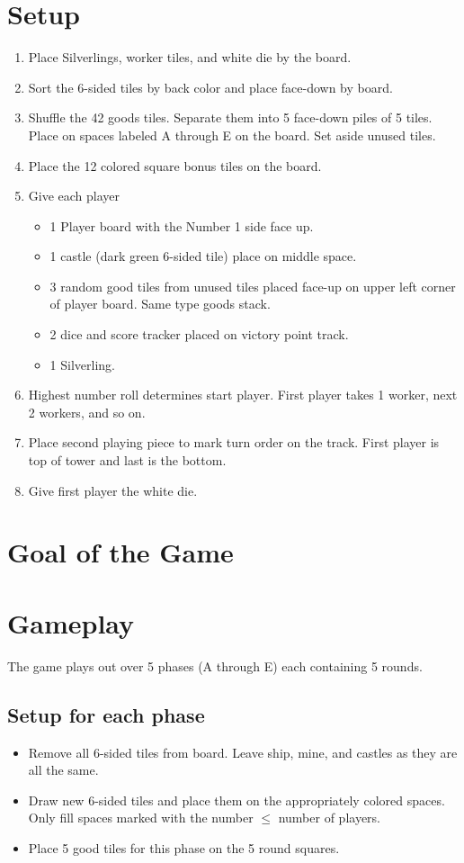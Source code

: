 \documentclass[12pt]{article}
\newenvironment{enumerateCustom}
{\begin{enumerate}
  \setlength{\itemsep}{1pt}
  \setlength{\parskip}{0pt}
  \setlength{\parsep}{0pt}}
{\end{enumerate}}
\newenvironment{itemizeCustom}
{\begin{itemize}
  \setlength{\itemsep}{1pt}
  \setlength{\parskip}{0pt}
  \setlength{\parsep}{0pt}}
{\end{itemize}}
\begin{document}
\begin{mdframed}[style = customFrame]
\begin{multicols*}{2}

\section*{Setup}
\begin{enumerateCustom}
	\item Place Silverlings, worker tiles, and white die by the board.
	\item Sort the 6-sided tiles by back color and place face-down by board.
	\item Shuffle the 42 goods tiles. Separate them into 5 face-down piles of 5 tiles. Place on spaces labeled A through E on the board. Set aside unused tiles.
	\item Place the 12 colored square bonus tiles on the board.
	\item Give each player
		\begin{itemizeCustom}
			\item 1 Player board with the Number 1 side face up.
			\item 1 castle (dark green 6-sided tile) place on middle space.
			\item 3 random good tiles from unused tiles placed face-up on upper left corner of player board. Same type goods stack.
			\item 2 dice and score tracker placed on victory point track.
			\item 1 Silverling.
		\end{itemizeCustom}
	\item Highest number roll determines start player. First player takes 1 worker, next 2 workers, and so on. 
	\item Place second playing piece to mark turn order on the track. First player is top of tower and last is the bottom.
	\item Give first player the white die.
\end{enumerateCustom}
\section*{Goal of the Game}
\section*{Gameplay}
The game plays out over 5 phases (A through E) each containing 5 rounds.
\subsection*{Setup for each phase}
\begin{itemizeCustom}
	\item Remove all 6-sided tiles from board. Leave ship, mine, and castles as they are all the same.
	\item Draw new 6-sided tiles and place them on the appropriately colored spaces. Only fill spaces marked with the number $\le$ number of players.
	\item Place 5 good tiles for this phase on the 5 round squares.
\end{itemizeCustom}

\end{multicols*}
\end{mdframed}
\end{document}
